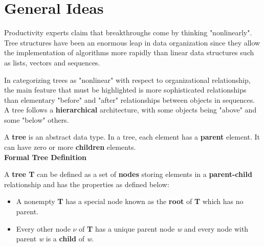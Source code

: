 %
%
%
 
 \section{General Ideas}
 
 		
		Productivity experts claim that breakthroughs come by thinking "nonlinearly". Tree structures have been an enormous leap in data organization since they allow the implementation of algorithms more rapidly than linear data structures such as lists, vectors and sequences.
		
		In categorizing trees as "nonlinear" with respect to organizational relationship, the main feature that must be highlighted is more sophisticated relationships than elementary "before" and "after" relationships between objects in sequences. A tree follows a \textbf{hierarchical} architecture, with some objects being "above" and some "below" others.
		
		A \textbf{tree} is an abstract data type. In a tree, each element has a \textbf{parent} element. It can have zero or more \textbf{children} elements.
		\\
		\textbf{Formal Tree Definition}
		
		A \textbf{tree T} can be defined as a set of \textbf{nodes} storing elements in a \textbf{parent-child} relationship and has the properties as defined below:
		\begin{itemize}
			\item A nonempty \textbf{T} has a special node known as the \textbf{root} of \textbf{T} which has no parent. 
			\item Every other node \textit{$\nu$} of \textbf{T} has a unique parent node \textit{w} and every node with parent \textit{w} is a \textbf{child} of \textit{w}.
		\end{itemize}

